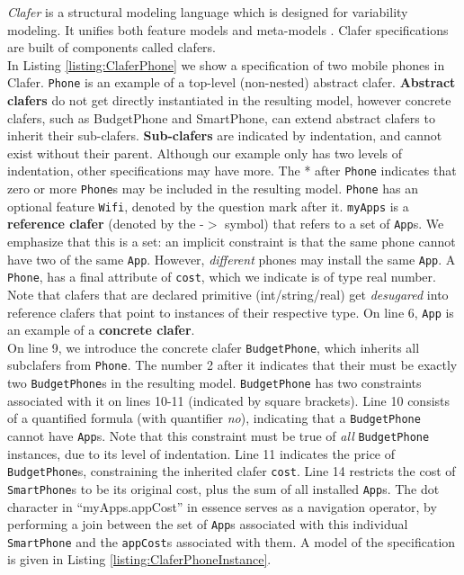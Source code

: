 \documentclass{easychair}
\newcommand{\eg}{\emph{e.g.}\xspace}
\begin{document}
\emph{Clafer} is a structural modeling language which is designed for variability modeling. It unifies both feature models  and meta-models \cite{BakClaferSLE2010}. Clafer specifications are built of components called clafers. \\
%
\indent In Listing \ref{listing:ClaferPhone}  we show a specification of two mobile phones in Clafer. 
%
 \texttt{Phone} is an example of a top-level (non-nested) abstract clafer. \textbf{Abstract clafers} do not get directly instantiated in the resulting model, however concrete clafers, such as BudgetPhone and SmartPhone, can extend abstract clafers to inherit their sub-clafers. \textbf{Sub-clafers} are indicated by indentation, and cannot exist without their parent. Although our example only has two levels of indentation, other specifications may have more. The * after \texttt{Phone} indicates that zero or more \texttt{Phone}s may be included in the resulting model. \texttt{Phone} has an optional feature \texttt{Wifi}, denoted by the question mark after it. \texttt{myApps} is a \textbf{reference clafer} (denoted by the  -$>$ symbol) that refers  to a set of \texttt{App}s. We emphasize that this is a set: an implicit constraint is that the same phone cannot have two of the same \texttt{App}. However, \textit{different} phones may install the same \texttt{App}. A \texttt{Phone}, has a final attribute of \texttt{cost}, which we indicate is of type real number. Note that clafers that are declared primitive (int/string/real) get \textit{desugared} into reference clafers that point to instances of their respective type. On line 6,  \texttt{App}  is an example of a \textbf{concrete clafer}.\\
%
\indent On line 9, we introduce the concrete clafer \texttt{BudgetPhone}, which inherits all subclafers from \texttt{Phone}. The number 2 after it indicates that their must be exactly two \texttt{BudgetPhone}s in the resulting model. \texttt{BudgetPhone} has two constraints associated with it on lines 10-11 (indicated by square brackets). Line 10 consists of a quantified formula (with quantifier \textit{no}), indicating that a \texttt{BudgetPhone} cannot have \texttt{App}s. Note that this constraint must be true of \textit{all} \texttt{BudgetPhone} instances, due to its level of indentation. Line 11 indicates the price of \texttt{BudgetPhone}s, constraining the inherited clafer \texttt{cost}. Line 14 restricts the cost of \texttt{SmartPhone}s to be its original cost, plus the sum of all installed \texttt{App}s. The dot character in ``myApps.appCost''  in essence serves as a navigation operator, by performing a join between the set of \texttt{App}s associated with this individual \texttt{SmartPhone} and the \texttt{appCost}s associated with them. A model of the specification is given in Listing \ref{listing:ClaferPhoneInstance}.\\ %
\end{document}
